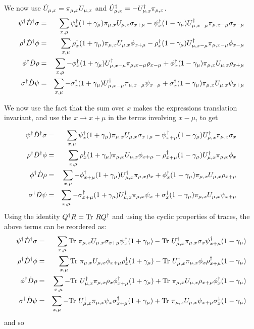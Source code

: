 \documentclass[12pt]{article}
\begin{document}
We now use $\dot{U}_{\mu,x} = \pi_{\mu,x} U_{\mu, x}$ and $\dot{U}^{\dagger}_{\mu,x}= -U^{\dagger}_{\mu,x} \pi_{\mu,x}$.
\begin{eqnarray}
\psidag \DdagDot \sigma &=& \sum_{x,\mu} \psidag_{x} \onepgm \pi_{\mu,x} U_{\mu,x}  \sigma_{x+\mu} - \psidag_{x} \onemgm \Udag_{\mu, x-\mu} \pi_{\mu, x-\mu} \sigma_{x-\mu}  \\
%
\rhodag \DdagDot \phi &=& \sum_{x,\mu} \rhodag_{x} \onepgm \pi_{\mu,x} U_{\mu,x}  \phi_{x+\mu} - \rhodag_{x} \onemgm \Udag_{\mu, x-\mu} \pi_{\mu, x-\mu} \phi_{x-\mu}  \\
%
\phidag \Ddot \rho &=& \sum_{x,\mu} - \phidag_{x} \onepgm \Udag_{\mu, x-\mu} \pi_{\mu, x-\mu} \rho_{x-\mu} + \phidag_x \onemgm \pi_{\mu,x} U_{\mu,x} \rho_{x+\mu}  \\
%
\sigmadag \Ddot \psi &=& \sum_{x,\mu} - \sigmadag_{x} \onepgm \Udag_{\mu, x-\mu} \pi_{\mu, x-\mu} \psi_{x-\mu} + \sigmadag_x \onemgm \pi_{\mu,x} U_{\mu,x} \psi_{x+\mu}  
\end{eqnarray}

We now use the fact that the sum over $x$ makes the expressions translation invariant, and use the $x \rightarrow x+\mu$ in the terms involving $x-\mu$, to get

\begin{eqnarray}
\psidag \DdagDot \sigma &=& \sum_{x,\mu} \psidag_{x} \onepgm \pi_{\mu,x} U_{\mu,x}  \sigma_{x+\mu} - \psidag_{x+\mu} \onemgm \Udag_{\mu, x} \pi_{\mu, x} \sigma_{x} \\
%
\rhodag \DdagDot \phi &=& \sum_{x,\mu} \rhodag_{x} \onepgm \pi_{\mu,x} U_{\mu,x}  \phi_{x+\mu} - \rhodag_{x+\mu} \onemgm \Udag_{\mu, x} \pi_{\mu, x} \phi_{x}  \\
%
\phidag \Ddot \rho &=& \sum_{x,\mu} - \phidag_{x+\mu} \onepgm \Udag_{\mu, x} \pi_{\mu, x} \rho_{x} + \phidag_x \onemgm \pi_{\mu,x} U_{\mu,x} \rho_{x+\mu}  \\
%
\sigmadag \Ddot \psi &=& \sum_{x,\mu} - \sigmadag_{x+\mu} \onepgm \Udag_{\mu, x} \pi_{\mu, x} \psi_{x} + \sigmadag_x \onemgm \pi_{\mu,x} U_{\mu,x} \psi_{x+\mu}  
\end{eqnarray}
Using the identity $Q^{\dagger}R = \mbox{Tr}\  R Q^{\dagger}$ and using the cyclic 
properties of traces, the above terms can be reordered as:
\begin{eqnarray}
\psidag \DdagDot \sigma &=& \sum_{x,\mu} \Tr \pi_{\mu,x} U_{\mu,x}  \sigma_{x+\mu} \psidag_{x}  \onepgm  - \Tr  \Udag_{\mu, x} \pi_{\mu, x} \sigma_{x} \psidag_{x+\mu} \onemgm \\
%
\rhodag \DdagDot \phi &=& \sum_{x,\mu} \Tr  \pi_{\mu,x} U_{\mu,x}  \phi_{x+\mu} \rhodag_{x}  \onepgm - \Tr \Udag_{\mu, x} \pi_{\mu, x} \phi_{x} \rhodag_{x+\mu} \onemgm  \\
%
\phidag \Ddot \rho &=& \sum_{x,\mu} - \Tr \Udag_{\mu, x}  \pi_{\mu, x} \rho_{x} \phidag_{x+\mu} \onepgm  + \Tr \pi_{\mu,x} U_{\mu,x} \rho_{x+\mu} \phidag_x \onemgm  \\
%
\sigmadag \Ddot \psi &=& \sum_{x,\mu} - \Tr \Udag_{\mu, x} \pi_{\mu, x} \psi_{x} \sigmadag_{x+\mu} \onepgm  + \Tr  \pi_{\mu,x} U_{\mu,x} \psi_{x+\mu} \sigmadag_x \onemgm 
\end{eqnarray}
and so
\end{document}
